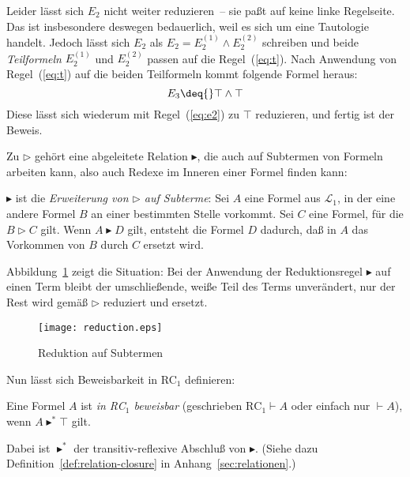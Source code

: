 Leider lässt sich $E_2$ nicht weiter reduzieren~-- sie paßt auf
keine linke Regelseite.  Das ist insbesondere deswegen bedauerlich, weil es sich
um eine Tautologie handelt.  Jedoch lässt sich $E_2$ als $E_2 = E_2^{(1)} \wedge
E_2^{(2)}$ schreiben und beide \textit{Teilformeln} $E_2^{(1)}$ und $E_2^{(2)}$
passen auf die Regel~(\ref{eq:t}).  Nach Anwendung von Regel~(\ref{eq:t}) auf die beiden
Teilformeln kommt folgende Formel heraus:
%
  \begin{displaymath}
    E_3 \deq{} \top \wedge \top
  \end{displaymath}
%
  Diese lässt sich wiederum mit Regel~(\ref{eq:e2}) zu $\top$ reduzieren,
  und fertig ist der Beweis.

Zu $\triangleright$ gehört eine abgeleitete
Relation $\blacktriangleright$, die auch auf
Subtermen von Formeln arbeiten kann, also auch Redexe im Inneren einer Formel
finden kann:
%
\begin{definition}
  $\blacktriangleright$ ist die \textit{Erweiterung von $\triangleright$ auf
    Subterme}: Sei $A$ eine Formel aus $\mathcal{L}_1$, in der eine andere
  Formel $B$ an einer bestimmten Stelle vorkommt.  Sei $C$ eine Formel, für die
  $B\triangleright C$ gilt.  Wenn
  $A\blacktriangleright D$ gilt, entsteht die Formel $D$ dadurch, daß in $A$
  das Vorkommen von $B$ durch $C$ ersetzt wird.  
\end{definition}
%
Abbildung~\ref{fig:reduction} zeigt die Situation: Bei der Anwendung
der Reduktionsregel $\blacktriangleright$ auf einen Term bleibt der
umschließende, weiße Teil des Terms unverändert, nur der Rest wird
gemäß $\triangleright$ reduziert und ersetzt.

\begin{figure}[tb]
  \begin{center}
    {
      \texttt{[image: reduction.eps]}
      }
    \caption{Reduktion auf Subtermen}
    \label{fig:reduction}
  \end{center}
\end{figure}


Nun lässt sich Beweisbarkeit in RC$_1$ definieren:
%
\begin{definition}[Beweisbarkeit in RC$_1$]
  Eine Formel $A$ ist \textit{in RC$_1$ beweisbar} (geschrieben
  $\mathrm{RC}_1 \vdash A$ oder einfach nur $\vdash A$), wenn
  $A\blacktriangleright^\ast\top$ gilt.
\end{definition}
%
Dabei ist $\blacktriangleright^\ast$ der
transitiv-reflexive Abschluß von $\blacktriangleright$.  (Siehe dazu
  Definition~\ref{def:relation-closure} in
  Anhang~\ref{sec:relationen}.)

